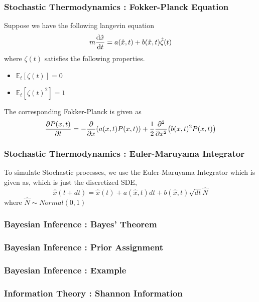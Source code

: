 \documentclass{beamer}
\begin{document}
\begin{frame}
  \frametitle{Stochastic Thermodynamics : Fokker-Planck Equation}
  \begin{definition}
    Suppose we have the following langevin equation 
    \begin{align}
      m\dv{\hat{x}}{t} = a(\hat{x},t) + b(\hat{x},t)\hat{\zeta}(t)
    \end{align}
    where $\zeta(t)$ satisfies the following properties. 
    \begin{itemize}
      \item $ \mathbb{E}_t[\zeta(t)] = 0$
      \item $ \mathbb{E}_t [\zeta(t)^2]= 1$
    \end{itemize}
    The corresponding Fokker-Planck is given as 
   \begin{align}
     \pdv{P(x,t)}{t} = -\pdv{x}(a(x,t)P(x,t)) + \frac{1}{2}\pdv[2]{x}(b(x,t)^2 P(x,t))
   \end{align} 
  \end{definition}

\end{frame}
\begin{frame}
  \frametitle{Stochastic Thermodynamics : Euler-Maruyama Integrator}
  \begin{definition}[EM Integrator]

    To simulate Stochastic processes, we use the Euler-Maruyama Integrator which is given as, which 
    is just the discretized SDE,
    \begin{equation}
      \hat{x}(t+dt) = \hat{x}(t) + a(\hat{x},t)dt + b(\hat{x},t)\sqrt{dt}\hat{N}
      \label{eq:EM}
    \end{equation}
    where $\hat{N} \sim Normal (0,1)$

  \end{definition}
\end{frame}
\begin{frame}
  \frametitle{Bayesian Inference : Bayes' Theorem}

\end{frame}
\begin{frame}
  \frametitle{Bayesian Inference : Prior Assignment}

\end{frame}
\begin{frame}
  \frametitle{Bayesian Inference : Example}

\end{frame}
\begin{frame}
  \frametitle{Information Theory : Shannon Information}

\end{frame}
\end{document}
